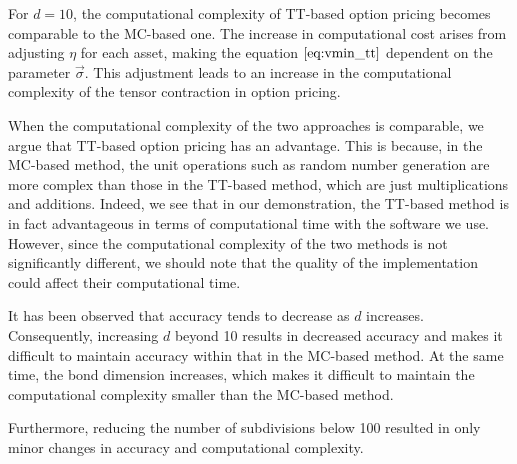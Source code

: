 For $d=10$, the computational complexity of TT-based option pricing becomes comparable to the MC-based one. 
The increase in computational cost arises from adjusting \(\eta\) for each asset, making the equation \(\eqref{eq:vmin_tt}\) dependent on the parameter \(\vec{\sigma}\). 
This adjustment leads to an increase in the computational complexity of the tensor contraction in option pricing.


When the computational complexity of the two approaches is comparable, we argue that TT-based option pricing has an advantage. 
This is because, in the MC-based method, the unit operations such as random number generation are more complex than those in the TT-based method, which are just multiplications and additions. 
Indeed, we see that in our demonstration, the TT-based method is in fact advantageous in terms of computational time with the software we use.
However, since the computational complexity of the two methods is not significantly different, we should note that the quality of the implementation could affect their computational time.

It has been observed that accuracy tends to decrease as \(d\) increases. 
Consequently, increasing \(d\) beyond 10 results in decreased accuracy and makes it difficult to maintain accuracy within that in the MC-based method. 
At the same time, the bond dimension increases, which makes it difficult to maintain the computational complexity smaller than the MC-based method.

Furthermore, reducing the number of subdivisions below 100 resulted in only minor changes in accuracy and computational complexity.



